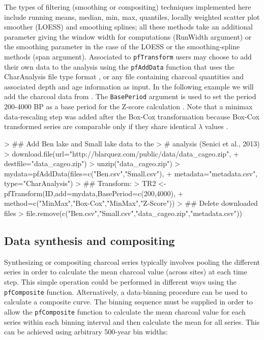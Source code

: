 \documentclass{elsarticle}
\begin{document}
The types of filtering (smoothing or compositing) techniques implemented here include running means, median, min, max, quantiles, locally weighted scatter plot smoother (LOESS) and smoothing splines; all these methods take an additional parameter giving the window width for computations (RunWidth argument) or the smoothing parameter in the case of the LOESS or the smoothing-spline methods (span argument). Associated to \texttt{pfTransform} users may choose to add their own data to the analysis using the \texttt{pfAddData} function that uses the CharAnalysis file type format \cite[][freely available at \url{https://github.com/phiguera/CharAnalysis}]{Higuera2009}, or any file containing charcoal quantities and associated depth and age information as input. In the following example we will add the charcoal data from \citet{Senici2013}. The \texttt{BasePeriod} argument is used to set the period 200-4000 BP as a base period for the Z-score calculation \citep{Power2008}. Note that a minimax data-rescaling step was added after the Box-Cox transformation because Box-Cox transformed series are comparable only if they share identical $\lambda$ values \citep{Marlon2008}.



\begin{Schunk}
\begin{Sinput}
> ## Add Ben lake and Small lake data to the 
> # analysis (Senici et al., 2013) 
> download.file(url="http://blarquez.com/public/data/data_cageo.zip", 
+                 destfile="data_cageo.zip")
> unzip("data_cageo.zip")
> mydata=pfAddData(files=c("Ben.csv","Small.csv"), 
+                    metadata="metadata.csv", type="CharAnalysis")
> ## Transform:
> TR2 <- pfTransform(ID,add=mydata,BasePeriod=c(200,4000),
+                    method=c("MinMax","Box-Cox","MinMax","Z-Score"))
> ## Delete downloaded files
> file.remove(c("Ben.csv","Small.csv","data_cageo.zip","metadata.csv"))
\end{Sinput}
\end{Schunk}

\subsection{Data synthesis and compositing}

Synthesizing or compositing charcoal series typically involves pooling the different series in order to calculate the mean charcoal value (across sites) at each time step. This simple operation could be performed in different ways using the \texttt{pfComposite} function. Alternatively, a data-binning procedure can be used to calculate a composite curve. The binning sequence must be supplied in order to allow the \texttt{pfComposite} function to calculate the mean charcoal value for each series within each binning interval and then calculate the mean for all series. This can be achieved using arbitrary 500-year bin widths:
\end{document}
